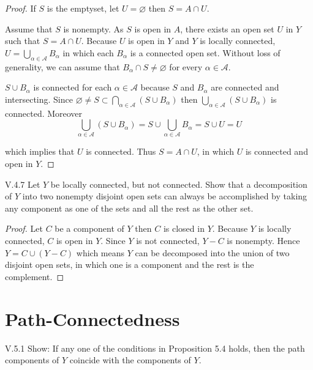 \begin{proof}
	If \( S \) is the emptyset, let \( U = \varnothing \) then \( S = A \cap U \).

	Assume that \( S \) is nonempty. As \( S \) is open in \( A \), there exists an open set \( U \) in \( Y \) such that \( S = A \cap U \). Because \( U \) is open in \( Y \) and \( Y \) is locally connected, \( U = \bigcup_{\alpha\in\mathscr{A}} B_{\alpha} \) in which each \( B_{\alpha} \) is a connected open set. Without loss of generality, we can assume that \( B_{\alpha} \cap S \ne \varnothing \) for every \( \alpha \in \mathscr{A} \).

	\( S \cup B_{\alpha} \) is connected for each \( \alpha \in \mathscr{A} \) because \( S \) and \( B_{\alpha} \) are connected and intersecting. Since \( \varnothing \ne S \subset \bigcap_{\alpha\in\mathscr{A}} (S \cup B_{\alpha}) \) then \( \bigcup_{\alpha\in\mathscr{A}} (S \cup B_{\alpha}) \) is connected. Moreover
	\[
		\bigcup_{\alpha\in\mathscr{A}} (S \cup B_{\alpha}) = S \cup \bigcup_{\alpha\in\mathscr{A}} B_{\alpha} = S \cup U = U
	\]

	which implies that \( U \) is connected. Thus \( S = A \cap U \), in which \( U \) is connected and open in \( Y \).
\end{proof}

\begin{problem}{V.4.7}
Let \( Y \) be locally connected, but not connected. Show that a decomposition of \( Y \) into two nonempty disjoint open sets can always be accomplished by taking any component as one of the sets and all the rest as the other set.
\end{problem}

\begin{proof}
	Let \( C \) be a component of \( Y \) then \( C \) is closed in \( Y \). Because \( Y \) is locally connected, \( C \) is open in \( Y \). Since \( Y \) is not connected, \( Y - C \) is nonempty. Hence \( Y = C \cup (Y - C) \) which means \( Y \) can be decomposed into the union of two disjoint open sets, in which one is a component and the rest is the complement.
\end{proof}

\section{Path-Connectedness}

\begin{problem}{V.5.1}
Show: If any one of the conditions in Proposition 5.4 holds, then the path components of \(Y\) coincide with the components of \(Y\).
\end{problem}


